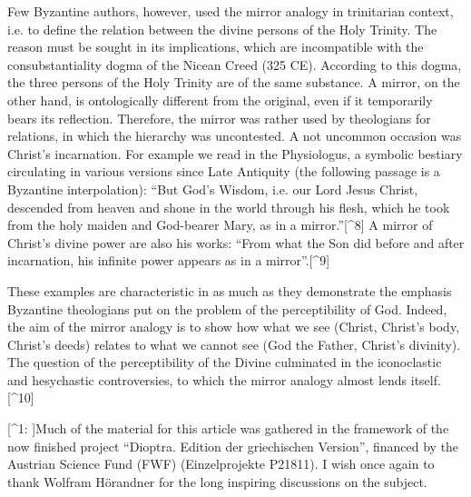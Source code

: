 Few Byzantine authors, however, used the mirror analogy in trinitarian context, i.e. to define the relation between the divine persons of the Holy Trinity. The reason must be sought in its implications, which are incompatible with the consubstantiality dogma of the Nicean Creed (325 CE). According to this dogma, the three persons of the Holy Trinity are of the same substance. A mirror, on the other hand, is ontologically different from the original, even if it temporarily bears its reflection. Therefore, the mirror was rather used by theologians for relations, in which the hierarchy was uncontested. A not uncommon occasion was Christ’s incarnation. For example we read in the Physiologus, a symbolic bestiary circulating in various versions since Late Antiquity (the following passage is a Byzantine interpolation): “But God’s Wisdom, i.e. our Lord Jesus Christ, descended from heaven and shone in the world through his flesh, which he took from the holy maiden and God-bearer Mary, as in a mirror.”[^8] A mirror of Christ’s divine power are also his works: “From what the Son did before and after incarnation, his infinite power appears as in a mirror”.[^9]

These examples are characteristic in as much as they demonstrate the emphasis Byzantine theologians put on the problem of the perceptibility of God. Indeed, the aim of the mirror analogy is to show how what we see (Christ, Christ’s body, Christ’s deeds) relates to what we cannot see (God the Father, Christ’s divinity). The question of the perceptibility of the Divine culminated in the iconoclastic and hesychastic controversies, to which the mirror analogy almost lends itself.[^10]



[^1: ]Much of the material for this article was gathered in the framework of the now finished project “Dioptra. Edition der griechischen Version”, financed by the Austrian Science Fund (FWF) (Einzelprojekte P21811). I wish once again to thank Wolfram Hörandner for the long inspiring discussions on the subject.

